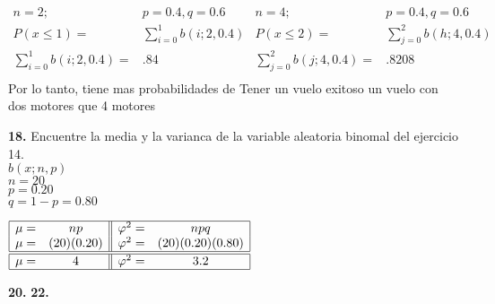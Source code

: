 \documentclass[12pt, letterpaper]{article}
\begin{document}
        \begin{center}
            \begin{math}
                \begin{array}{cc||cc}
                n=2 ;&p=0.4,q=0.6&n=4 ;&p=0.4,q=0.6\\
                    P(x\leq 1)=&\displaystyle\sum^{1}_{i=0} b(i;2,0.4)&P(x\leq 2)=&\displaystyle\sum^{2}_{j=0} b(h;4,0.4)\\ 
                    \displaystyle\sum^{1}_{i=0} b(i;2,0.4)=&.84&\displaystyle\sum^{2}_{j=0} b(j;4,0.4)=&.8208\\    
                \end{array}
         \end{math}
        \\Por lo tanto, tiene mas probabilidades de Tener un vuelo exitoso un vuelo con dos motores que 4 motores 
        \end{center}\vskip1cm
        \textbf{18.} Encuentre la media y la varianca de la variable aleatoria binomal del ejercicio 14.\\
        $b(x;n,p)$\\
        $n=20$\\
        $p=0.20$\\
        $q=1-p=0.80$\\
        \begin{center}
            \begin{math}
                \begin{array}{|c c || c c|}
                    \hline
                    \mu =& np & \varphi^2 =& npq \\
                    \mu =& (20)(0.20) & \varphi^2 =&(20)(0.20)(0.80)\\
                    \hline
                    \hline
                    \mu =&  4 & \varphi^2 =& 3.2 \\    
                    \hline
                \end{array} 
            \end{math}
        \end{center}\vskip1cm
    \textbf{20. }\vskip1cm
    \textbf{22. }\vskip1cm
\end{document}
